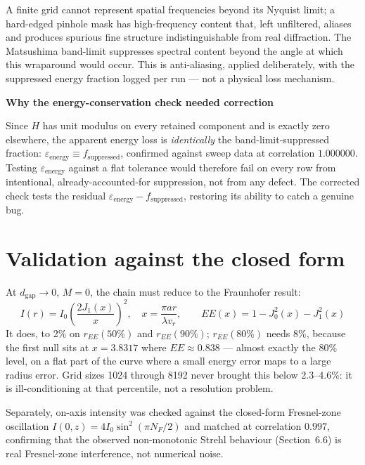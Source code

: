\documentclass[11pt]{report}
\newenvironment{keybox}[1]%
{\par\vspace{6pt}\begin{lrbox}{\kbsave}\begin{minipage}{0.88\textwidth}%
{\bfseries\color{hbblue}#1}\par\vspace{4pt}\ignorespaces}%
{\end{minipage}\end{lrbox}%
\begin{center}\setlength{\fboxrule}{1.2pt}\setlength{\fboxsep}{7pt}%
\fcolorbox{hbblue}{boxgrey}{\usebox{\kbsave}}\end{center}\vspace{6pt}\par}
\begin{document}
A finite grid cannot represent spatial frequencies beyond its Nyquist limit; a hard-edged
pinhole mask has high-frequency content that, left unfiltered, aliases and produces
spurious fine structure indistinguishable from real diffraction. The Matsushima band-limit
suppresses spectral content beyond the angle at which this wraparound would occur. This is
anti-aliasing, applied deliberately, with the suppressed energy fraction logged per run ---
not a physical loss mechanism.

\begin{keybox}{Why the energy-conservation check needed correction}
Since $H$ has unit modulus on every retained component and is exactly zero elsewhere, the
apparent energy loss is \emph{identically} the band-limit-suppressed fraction:
$\varepsilon_{\text{energy}} \equiv f_{\text{suppressed}}$, confirmed against sweep data at
correlation $1.000000$. Testing $\varepsilon_{\text{energy}}$ against a flat tolerance would
therefore fail on every row from intentional, already-accounted-for suppression, not from
any defect. The corrected check tests the residual
$\varepsilon_{\text{energy}} - f_{\text{suppressed}}$, restoring its ability to catch a
genuine bug.
\end{keybox}

\section{Validation against the closed form}

At $d_{\text{gap}}\to 0$, $M=0$, the chain must reduce to the Fraunhofer result:
\begin{equation}
I(r) = I_0\left(\frac{2J_1(x)}{x}\right)^2, \quad x=\frac{\pi a r}{\lambda v_r}, \qquad
EE(x) = 1 - J_0^2(x) - J_1^2(x)
\end{equation}
It does, to 2\% on $r_{EE}(50\%)$ and $r_{EE}(90\%)$; $r_{EE}(80\%)$ needs 8\%, because the
first null sits at $x=3.8317$ where $EE\approx0.838$ --- almost exactly the 80\% level, on a
flat part of the curve where a small energy error maps to a large radius error. Grid sizes
1024 through 8192 never brought this below 2.3--4.6\%: it is ill-conditioning at that
percentile, not a resolution problem.

Separately, on-axis intensity was checked against the closed-form Fresnel-zone oscillation
$I(0,z) = 4I_0\sin^2(\pi N_F/2)$ and matched at correlation $0.997$, confirming that the
observed non-monotonic Strehl behaviour (Section~6.6) is real Fresnel-zone interference, not
numerical noise.
\end{document}
